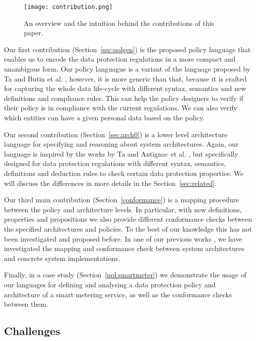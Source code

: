 \documentclass[a4paper]{article}
\begin{document}
\begin{figure}[htb!]
    \begin{center}
        \texttt{[image: contribution.png]}
    \end{center}
    \caption{An overview and the intuition behind the contributions of this paper.}
    \label{fig:contribution}
\end{figure} 

Our first contribution (Section~\ref{sec:polgen}) is the proposed policy language that enables us to encode the data protection regulations in a more compact and unambigous form.  Our policy languague is a variant of the language proposed by Ta and Butin et al. \cite{TaButin15, ButinFM14}, however, it is more generic than that, because it is crafted for capturing the whole data life-cycle with different syntax, semantics and new definitions and compliance rules. This can help the policy designers to verify if their policy is in compliance with the current regulations. We can also verify which entities can have a given personal data based on the policy.  
 
Our second contribution (Section~\ref{sec:arch0}) is a lower level architecture language for specifying and reasoning about system architectures.  Again, our language is inspired by the works by Ta and Antignac et al. \cite{TaAntignac14, Antignac14}, but specifically designed for data protection regulations with different syntax, semantics, definitions and deduction rules to check certain data protection properties. We will discuss the differences in more details in the Section~\ref{sec:related}. 

Our third main contribution (Section~\ref{conformance}) is a mapping procedure between the policy and architecture levels. In particular, with new definitions, properties and propositions we also provide different conformance checks between the specified architectures and policies. To the best of our knowledge this has not been investigated and proposed before. In one of our previous works  \cite{TaAntignac14}, we have investigated the mapping and conformance check between system architectures and concrete system implementations.    

Finally, in a case study (Section~\ref{pol:smartmeter}) we demonstrate the usage of our languages for defining and analysing a data protection policy and architecture of a smart metering service, as well as the conformance checks between them. 

\subsection{Challenges}
\label{sec:challenge}
\end{document}
